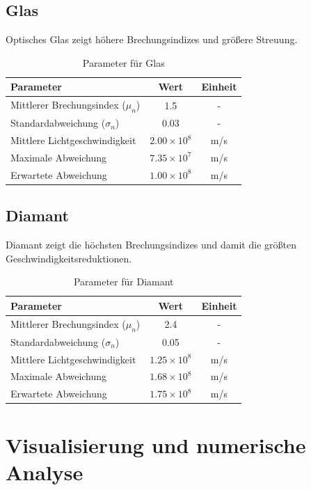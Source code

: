\documentclass[12pt,a4paper,oneside]{article}
\theoremstyle{definition}
\theoremstyle{remark}
\begin{document}
\subsection{Glas}

Optisches Glas zeigt höhere Brechungsindizes und größere Streuung.

\begin{table}[h]
\centering
\begin{tabular}{|l|c|c|}
\toprule
\textbf{Parameter} & \textbf{Wert} & \textbf{Einheit} \\
\midrule
Mittlerer Brechungsindex ($\mu_n$) & 1.5 & - \\
Standardabweichung ($\sigma_n$) & 0.03 & - \\
Mittlere Lichtgeschwindigkeit & $2.00 \times 10^8$ & m/s \\
Maximale Abweichung & $7.35 \times 10^7$ & m/s \\
Erwartete Abweichung & $1.00 \times 10^8$ & m/s \\
\bottomrule
\end{tabular}
\caption{Parameter für Glas}
\end{table}

\subsection{Diamant}

Diamant zeigt die höchsten Brechungsindizes und damit die größten Geschwindigkeitsreduktionen.

\begin{table}[h]
\centering
\begin{tabular}{|l|c|c|}
\toprule
\textbf{Parameter} & \textbf{Wert} & \textbf{Einheit} \\
\midrule
Mittlerer Brechungsindex ($\mu_n$) & 2.4 & - \\
Standardabweichung ($\sigma_n$) & 0.05 & - \\
Mittlere Lichtgeschwindigkeit & $1.25 \times 10^8$ & m/s \\
Maximale Abweichung & $1.68 \times 10^8$ & m/s \\
Erwartete Abweichung & $1.75 \times 10^8$ & m/s \\
\bottomrule
\end{tabular}
\caption{Parameter für Diamant}
\end{table}

\section{Visualisierung und numerische Analyse}
\end{document}
